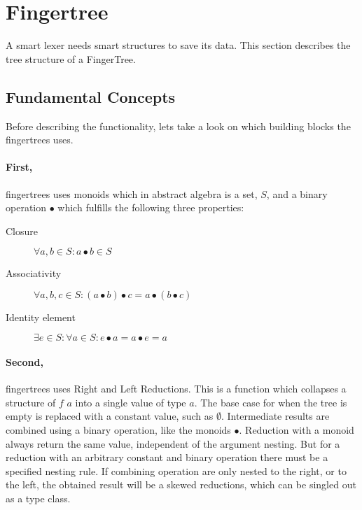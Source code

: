 \section{Fingertree}
A smart lexer needs smart structures to save its data. This section describes 
the tree structure of a FingerTree.

\subsection{Fundamental Concepts}
Before describing the functionality, lets take a look on which building blocks
the fingertrees uses.
\paragraph{First,}
fingertrees uses monoids which in abstract algebra is a set, $S$, and a binary operation $\bullet$ which fulfills the following
three properties:
\begin{description}
\item[Closure] $\forall a,b \in S: a \bullet b \in S$
\item[Associativity] $\forall a,b,c \in S: (a \bullet b) \bullet c = a \bullet (b \bullet c)$
\item[Identity element] $\exists e \in S: \forall a \in S: e \bullet a = a \bullet e = a$
\end{description}

\paragraph{Second,} 
fingertrees uses Right and Left Reductions. This is a function which
collapses a structure of $f$ $a$ into a single value of type $a$. The base case
for when the tree is empty is replaced with a constant value, such as 
$\emptyset$. Intermediate results are combined using a binary operation, like
the monoids $\bullet$. Reduction with a monoid always return the same value,
independent of the argument nesting. But for a reduction with an arbitrary
constant and binary operation there must be a specified nesting rule. If
combining operation are only nested to the right, or to the left, the obtained
result will be a skewed reductions, which can be singled out as a type class.


